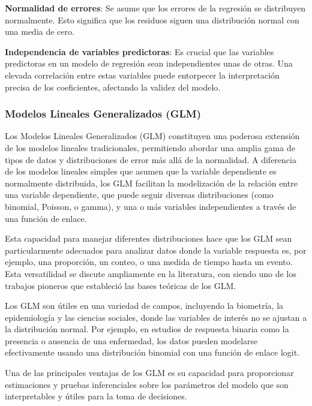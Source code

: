 \documentclass[
  11pt,
  bookmarksnumbered]{article}
\begin{document}
\textbf{Normalidad de errores}: Se asume que los errores de la regresión se distribuyen normalmente.
Esto significa que los residuos siguen una distribución normal con una media de cero.

\textbf{Independencia de variables predictoras}: Es crucial que las variables predictoras en un modelo de regresión sean independientes unas de otras.
Una elevada correlación entre estas variables puede entorpecer la interpretación precisa de los coeficientes, afectando la validez del modelo.

\hypertarget{modelos-lineales-generalizados-glm}{%
\subsubsection{Modelos Lineales Generalizados (GLM)}\label{modelos-lineales-generalizados-glm}}

Los Modelos Lineales Generalizados (GLM) constituyen una poderosa extensión de los modelos lineales tradicionales, permitiendo abordar una amplia gama de tipos de datos y distribuciones de error más allá de la normalidad.
A diferencia de los modelos lineales simples que asumen que la variable dependiente es normalmente distribuida, los GLM facilitan la modelización de la relación entre una variable dependiente, que puede seguir diversas distribuciones (como binomial, Poisson, o gamma), y una o más variables independientes a través de una función de enlace.

Esta capacidad para manejar diferentes distribuciones hace que los GLM sean particularmente adecuados para analizar datos donde la variable respuesta es, por ejemplo, una proporción, un conteo, o una medida de tiempo hasta un evento.
Esta versatilidad se discute ampliamente en la literatura, con \autocite{nelder1972generalized} siendo uno de los trabajos pioneros que estableció las bases teóricas de los GLM.

Los GLM son útiles en una variedad de campos, incluyendo la biometría, la epidemiología y las ciencias sociales, donde las variables de interés no se ajustan a la distribución normal.
Por ejemplo, en estudios de respuesta binaria como la presencia o ausencia de una enfermedad, los datos pueden modelarse efectivamente usando una distribución binomial con una función de enlace logit.

Una de las principales ventajas de los GLM es su capacidad para proporcionar estimaciones y pruebas inferenciales sobre los parámetros del modelo que son interpretables y útiles para la toma de decisiones.
\end{document}
